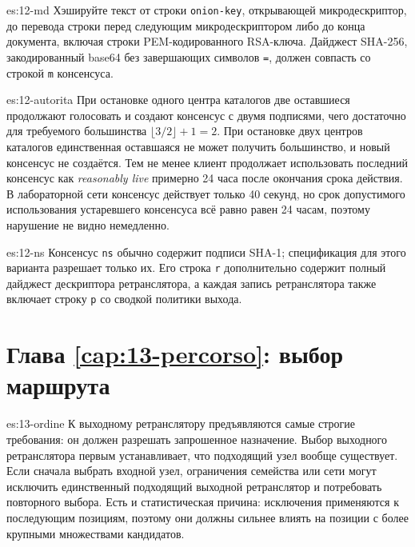 \begin{soluzione}{es:12-md}
Хэшируйте текст от строки \texttt{onion-key}, открывающей микродескриптор, до перевода строки перед следующим микродескриптором либо до конца документа, включая строки PEM-кодированного RSA-ключа. Дайджест SHA-256, закодированный base64 без завершающих символов \texttt{=}, должен совпасть со строкой \texttt{m} консенсуса.
\end{soluzione}

\begin{soluzione}{es:12-autorita}
При остановке одного центра каталогов две оставшиеся продолжают голосовать и создают консенсус с двумя подписями, чего достаточно для требуемого большинства $\lfloor 3/2 \rfloor + 1 = 2$. При остановке двух центров каталогов единственная оставшаяся не может получить большинство, и новый консенсус не создаётся. Тем не менее клиент продолжает использовать последний консенсус как \emph{reasonably live} примерно 24 часа после окончания срока действия. В лабораторной сети консенсус действует только 40 секунд, но срок допустимого использования устаревшего консенсуса всё равно равен 24 часам, поэтому нарушение не видно немедленно.
\end{soluzione}

\begin{soluzione}{es:12-ns}
Консенсус \texttt{ns} обычно содержит подписи SHA-1; спецификация для этого варианта разрешает только их. Его строка \texttt{r} дополнительно содержит полный дайджест дескриптора ретранслятора, а каждая запись ретранслятора также включает строку \texttt{p} со сводкой политики выхода.
\end{soluzione}

\section*{Глава \ref{cap:13-percorso}: выбор маршрута}

\begin{soluzione}{es:13-ordine}
К выходному ретранслятору предъявляются самые строгие требования: он должен разрешать запрошенное назначение. Выбор выходного ретранслятора первым устанавливает, что подходящий узел вообще существует. Если сначала выбрать входной узел, ограничения семейства или сети могут исключить единственный подходящий выходной ретранслятор и потребовать повторного выбора. Есть и статистическая причина: исключения применяются к последующим позициям, поэтому они должны сильнее влиять на позиции с более крупными множествами кандидатов.
\end{soluzione}

